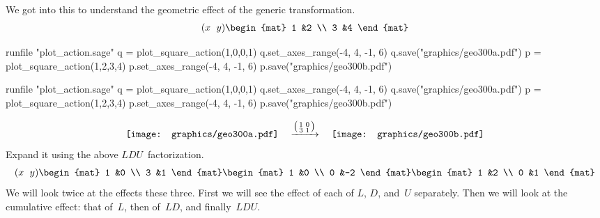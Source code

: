 We got into this to understand 
the geometric effect of the generic transformation.
\begin{equation*}
  \rowvec{x &y}
  \begin{mat}
   1 &2 \\
   3 &4 
  \end{mat}
\end{equation*}
\begin{sageoutput}[d,0,4;d,5,7]
runfile "plot_action.sage"
q = plot_square_action(1,0,0,1) 
q.set_axes_range(-4, 4, -1, 6) 
q.save("graphics/geo300a.pdf")
p = plot_square_action(1,2,3,4) 
p.set_axes_range(-4, 4, -1, 6) 
p.save("graphics/geo300b.pdf")
\end{sageoutput}
\begin{sagesilent}
runfile "plot_action.sage"
q = plot_square_action(1,0,0,1) 
q.set_axes_range(-4, 4, -1, 6) 
q.save("graphics/geo300a.pdf")
p = plot_square_action(1,2,3,4) 
p.set_axes_range(-4, 4, -1, 6) 
p.save("graphics/geo300b.pdf")
\end{sagesilent}
\begin{equation*}
  \vcenteredhbox{\texttt{[image: graphics/geo300a.pdf]}}
  \quad\mapsvia{\big (\begin{smallmatrix} 1 &0 \\ 3 &1 \end{smallmatrix}\big )}\quad
  \vcenteredhbox{\texttt{[image: graphics/geo300b.pdf]}}
\end{equation*}
\noindent Expand it using the above $LDU$~factorization. 
\begin{equation*}
  \rowvec{x &y}
  \begin{mat}
   1 &0 \\
   3 &1 
  \end{mat}
  \begin{mat}
    1 &0 \\
    0 &-2
  \end{mat}
  \begin{mat}
    1 &2 \\
    0 &1
  \end{mat}  
\end{equation*}
We will look twice at the effects these three.
First we will see the effect of each of $L$, $D$, and~$U$ separately.
Then we will look at the cumulative effect: that of~$L$, then of~$LD$, 
and finally~$LDU$.

